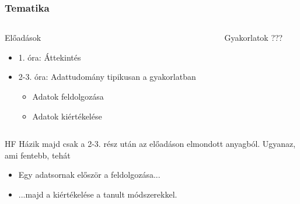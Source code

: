 \begin{frame}
\frametitle{Tematika}

\begin{columns}
\begin{column}{0.45\textwidth}
	\begin{block}{Előadások}
		\begin{itemize}
			\item 1. óra: Áttekintés
			\item 2-3. óra: Adattudomány tipikusan a gyakorlatban
			\begin{itemize}
				\item Adatok feldolgozása
				\item Adatok kiértékelése
			\end{itemize}
		\end{itemize}
	\end{block}
\end{column}
\begin{column}{0.45\textwidth}  %
    \begin{alertblock}{Gyakorlatok}
		\centering
		\vspace{2.54em}
		???
		\vspace{2.54em}
	\end{alertblock}
\end{column}
\end{columns}

\begin{exampleblock}{HF}
	Házik majd csak a 2-3. rész után az előadáson elmondott anyagból. Ugyanaz, ami fentebb, tehát
	\begin{itemize}
		\item Egy adatsornak először a feldolgozása...
		\item ...majd a kiértékelése a tanult módszerekkel.
	\end{itemize}
\end{exampleblock}

\end{frame}